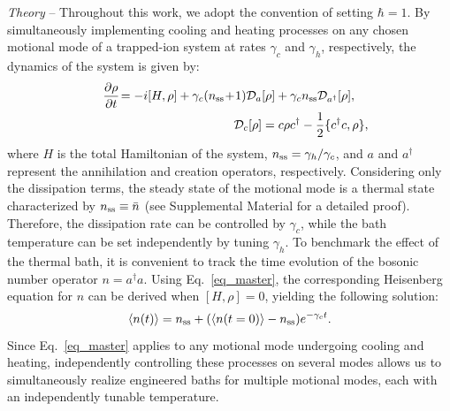 \documentclass[%
reprint,
superscriptaddress,
amsmath,amssymb,
aps,
prl,
floatfix,
]{revtex4-2}
\begin{document}
\emph{Theory} -- Throughout this work, we adopt the convention of setting $\hbar=1$. By simultaneously implementing cooling and heating processes on any chosen motional mode of a trapped-ion system at rates $\gamma_c$ and $\gamma_h$, respectively, the dynamics of the system is given by:
\begin{eqnarray}
    &&\frac{\partial\rho}{\partial t}\!=-i[H,\rho] +\gamma_c (n_{\rm ss}\!+\!1)\mathcal{D}_{a}[\rho] + \gamma_c n_{\rm ss} \mathcal{D}_{a^\dagger}[\rho],\;\;\;\;
    \nonumber\\
    &&\mathcal{D}_c[\rho]=c\rho c^\dagger -\frac{1}{2}\{c^\dagger c,\rho\},
    \label{eq_master}
\end{eqnarray}
where $H$ is the total Hamiltonian of the system, $n_{\rm ss}=\gamma_h/\gamma_c$, and $a$ and $a^\dagger$ represent the annihilation and creation operators, respectively. Considering only the dissipation terms, the steady state of the motional mode is a thermal state characterized by $n_{\rm ss}\equiv\bar{n}$ \cite{carmichael2013statistical} (see Supplemental Material \cite{so2025fT_supp} for a detailed proof). Therefore, the dissipation rate can be controlled by $\gamma_c$, while the bath temperature can be set independently by tuning $\gamma_h$.  
To benchmark the effect of the thermal bath, it is convenient to track the time evolution of the bosonic number operator $n=a^\dagger a$. Using Eq.~\eqref{eq_master}, the corresponding Heisenberg equation for $n$ can be derived when $[H,\rho]=0$, yielding the following solution:
\begin{equation}
    \braket{n(t)} = n_{\rm ss} + (\braket{n(t=0)}- n_{\rm ss})e^{-\gamma_c t}.
    \label{eq_ndynamics}
\end{equation}
Since Eq.~\eqref{eq_master} applies to any motional mode undergoing cooling and heating, independently controlling these processes on several modes allows us to simultaneously realize engineered baths for multiple motional modes, each with an independently tunable temperature.

\iffalse
\end{document}

